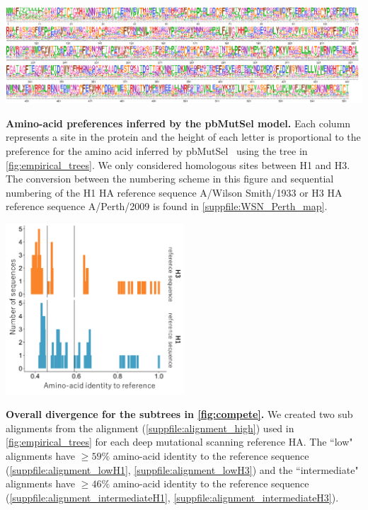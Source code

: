 \documentclass[11pt]{article}
\begin{document}
\begin{suppfig}[H]
\centerline{\includegraphics[width=\textwidth]{figures/prefs_mutSel}}
\caption{\label{suppfig:prefs_mutSel}
\textbf{Amino-acid preferences inferred by the pbMutSel model.}
Each column represents a site in the protein and the height of each letter is proportional to the preference for the amino acid inferred by pbMutSel~\citep{rodrigue2014site} using the tree in \ref{fig:empirical_trees}. 
We only considered homologous sites between H1 and H3. 
The conversion between the numbering scheme in this figure and sequential numbering of the H1 HA reference sequence A/Wilson Smith/1933 or H3 HA reference sequence A/Perth/2009 is found in \ref{suppfile:WSN_Perth_map}. 
}
\end{suppfig}

\begin{suppfig}[H]
\centerline{\includegraphics[width=0.50\textwidth]{figures/divergence_distances.pdf}}
\caption{\label{suppfig:subalignments}
\textbf{Overall divergence for the subtrees in \ref{fig:compete}.} 
We created two sub alignments from the alignment (\ref{suppfile:alignment_high}) used in \ref{fig:empirical_trees} for each deep mutational scanning reference HA. 
The ``low" alignments have $\ge59\%$ amino-acid identity to the reference sequence (\ref{suppfile:alignment_lowH1}, \ref{suppfile:alignment_lowH3}) and the ``intermediate" alignments have $\ge46\%$ amino-acid identity to the reference sequence (\ref{suppfile:alignment_intermediateH1}, \ref{suppfile:alignment_intermediateH3}).
}
\end{suppfig}
\end{document}
